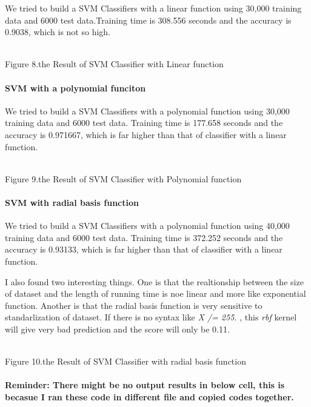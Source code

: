 \documentclass[11pt]{article}
\begin{document}
We tried to build a SVM Classifiers with a linear function using 30,000
training data and 6000 test data.Training time is 308.556 seconds and
the accuracy is 0.9038, which is not so high.

\\
Figure 8.the Result of SVM Classifier with Linear function

\paragraph{SVM with a polynomial
funciton}\label{svm-with-a-polynomial-funciton}

We tried to build a SVM Classifiers with a polynomial function using
30,000 training data and 6000 test data. Training time is 177.658
seconds and the accuracy is 0.971667, which is far higher than that of
classifier with a linear function.

\\
Figure 9.the Result of SVM Classifier with Polynomial function

\paragraph{SVM with radial basis
function}\label{svm-with-radial-basis-function}

We tried to build a SVM Classifiers with a polynomial function using
40,000 training data and 6000 test data. Training time is 372.252
seconds and the accuracy is 0.93133, which is far higher than that of
classifier with a linear function.

I also found two interesting things. One is that the realtionship
between the size of dataset and the length of running time is noe linear
and more like exponential function. Another is that the radial basis
function is very sensitive to standarlization of dataset. If there is no
syntax like \emph{X /= 255.} , this \emph{rbf} kernel will give very bad
prediction and the score will only be 0.11.

\\
Figure 10.the Result of SVM Classifier with radial basis function

\paragraph{Reminder: There might be no output results in below cell,
this is becasue I ran these code in different file and copied codes
together.}\label{reminder-there-might-be-no-output-results-in-below-cell-this-is-becasue-i-ran-these-code-in-different-file-and-copied-codes-together.}
\end{document}
